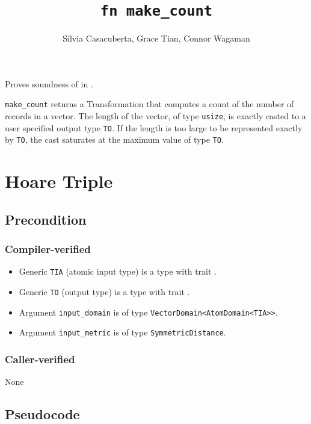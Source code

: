 \documentclass{article}
\title{\texttt{fn make\_count}}
\author{S\'ilvia Casacuberta, Grace Tian, Connor Wagaman}
\date{}
\begin{document}
 
 
\maketitle 
 
Proves soundness of  in . 
 
\texttt{make\_count} returns a Transformation that computes a count of the number of records in a vector. 
The length of the vector, of type \texttt{usize}, is exactly casted to a user specified output type \texttt{TO}. 
If the length is too large to be represented exactly by \texttt{TO},  
the cast saturates at the maximum value of type \texttt{TO}. 
 
\section{Hoare Triple} 
\subsection*{Precondition} 
 
\subsubsection*{Compiler-verified} 
\begin{itemize} 
    \item Generic \texttt{TIA} (atomic input type) is a type with trait . 
    \item Generic \texttt{TO} (output type) is a type with trait . 
    \item Argument \texttt{input\_domain} is of type \texttt{VectorDomain<AtomDomain<TIA>{}>}. 
    \item Argument \texttt{input\_metric} is of type \texttt{SymmetricDistance}. 
\end{itemize} 
 
\subsubsection*{Caller-verified} 
None 
 
\subsection*{Pseudocode} 
 
 
\end{document}
